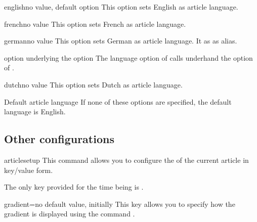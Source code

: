 \documentclass[english,nolocaltoc]{nwejmart}
\newtheorem[style=definition]{fact}
\newtheorem[title-plural=Criteria]{criterion}
\newtheorem[title=random experiment]{rexp}
\begin{document}
\begin{docKey}{english}{}{no value, default option}
  This option sets English as article language.
\end{docKey}
\begin{docKey}{french}{}{no value}
  This option sets French as article language.
\end{docKey}
\begin{docKey}{german}{}{no value}
  This option sets German as article language. It as  as alias.
  \begin{dbremark}{ option underlying the \protect{} option}{}
    The  language option of \nwejmauthorcl{} calls underhand the  option of .
  \end{dbremark}
\end{docKey}
\begin{docKey}{dutch}{}{no value}
  This option sets Dutch as article language.
\end{docKey}

\begin{dbremark}{Default article language}{}
  If none of these options are specified, the default language is English.
\end{dbremark}

\subsection{Other configurations}
\label{sec:autr-conf}

\begin{docCommand}{articlesetup}{}
  This command allows you to configure the  of the current article in key/value form.

  The only key provided for the time being is .
  \begin{docKey}{gradient}{=\textbar{}}{no default value, initially }
    This key allows you to specify how the gradient is displayed using the command .
  \end{docKey}
\end{docCommand}

\end{document}

